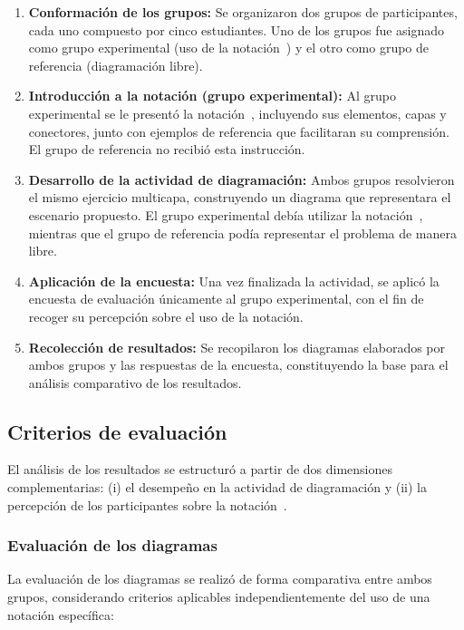 \begin{enumerate}
\item \textbf{Conformación de los grupos:} Se organizaron dos grupos de participantes, cada uno compuesto por cinco estudiantes. Uno de los grupos fue asignado como grupo experimental (uso de la notación~\NDITI) y el otro como grupo de referencia (diagramación libre).

\item \textbf{Introducción a la notación (grupo experimental):} Al grupo experimental se le presentó la notación~\NDITI{}, incluyendo sus elementos, capas y conectores, junto con ejemplos de referencia que facilitaran su comprensión. El grupo de referencia no recibió esta instrucción.

\item \textbf{Desarrollo de la actividad de diagramación:} Ambos grupos resolvieron el mismo ejercicio multicapa, construyendo un diagrama que representara el escenario propuesto. El grupo experimental debía utilizar la notación~\NDITI{}, mientras que el grupo de referencia podía representar el problema de manera libre.

\item \textbf{Aplicación de la encuesta:} Una vez finalizada la actividad, se aplicó la encuesta de evaluación únicamente al grupo experimental, con el fin de recoger su percepción sobre el uso de la notación.

\item \textbf{Recolección de resultados:} Se recopilaron los diagramas elaborados por ambos grupos y las respuestas de la encuesta, constituyendo la base para el análisis comparativo de los resultados.
\end{enumerate}

\subsection{Criterios de evaluación}
\noindent
El análisis de los resultados se estructuró a partir de dos dimensiones complementarias: (i) el desempeño en la actividad de diagramación y (ii) la percepción de los participantes sobre la notación~\NDITI.

\subsubsection{Evaluación de los diagramas}
\noindent
La evaluación de los diagramas se realizó de forma comparativa entre ambos grupos, considerando criterios aplicables independientemente del uso de una notación específica:

